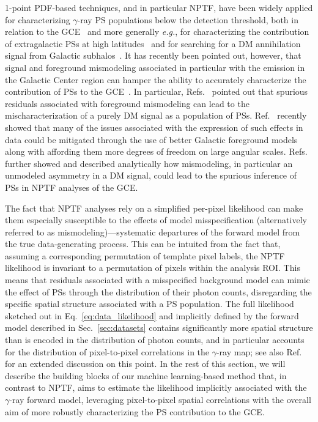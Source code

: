 \documentclass[prd,aps,10pt,nofootinbib,twocolumn,superscriptaddress,preprintnumbers,balancelastpage,longbibliography,floatfix]{revtex4-2}
\begin{document}
1-point PDF-based techniques, and in particular NPTF, have been widely applied for characterizing $\gamma$-ray PS populations below the \Fermi detection threshold, both in relation to the GCE~\cite{Lee:2015fea,Leane:2020pfc,Leane:2020nmi,Buschmann:2020adf,Calore:2021bty} and more generally \emph{e.g.}, for characterizing the contribution of extragalactic PSs at high latitudes~\cite{Lisanti:2016jub,Zechlin:2016pme,Zechlin:2015wdz} and for searching for a DM annihilation signal from Galactic subhalos~\cite{Somalwar:2020awt}. It has recently been pointed out, however, that signal and foreground mismodeling associated in particular with the emission in the Galactic Center region can hamper the ability to accurately characterize the contribution of PSs to the GCE~\cite{Leane:2019xiy,Leane:2020pfc}. In particular, Refs.~\cite{Lee:2015fea,Leane:2019xiy,Chang:2019ars} pointed out that spurious residuals associated with foreground mismodeling can lead to the mischaracterization of a purely DM signal as a population of PSs. Ref.~\cite{Buschmann:2020adf} recently showed that many of the issues associated with the expression of such effects in \Fermi data could be mitigated through the use of better Galactic foreground models along with affording them more degrees of freedom on large angular scales.
Refs.~\cite{Leane:2020pfc,Leane:2020nmi} further showed and described analytically how mismodeling, in particular an unmodeled asymmetry in a DM signal, could lead to the spurious inference of PSs in NPTF analyses of the GCE.

The fact that NPTF analyses rely on a simplified per-pixel likelihood can make them especially susceptible to the effects of model misspecification (alternatively referred to as mismodeling)---systematic departures of the forward model from the true data-generating process. This can be intuited from the fact that, assuming a corresponding permutation of template pixel labels, the NPTF likelihood is invariant to a permutation of pixels within the analysis ROI. This means that residuals associated with a misspecified background model can mimic the effect of PSs through the distribution of their photon counts, disregarding the specific spatial structure associated with a PS population. The full likelihood sketched out in Eq.~\eqref{eq:data_likelihood} and implicitly defined by the forward model described in Sec.~\ref{sec:datasets} contains significantly more spatial structure than is encoded in the distribution of photon counts, and in particular accounts for the distribution of pixel-to-pixel correlations in the $\gamma$-ray map; see also Ref.~\cite{List:2021aer} for an extended discussion on this point.
In the rest of this section, we will describe the building blocks of our machine learning-based method that, in contrast to NPTF, aims to estimate the likelihood implicitly associated with the $\gamma$-ray forward model, leveraging pixel-to-pixel spatial correlations with the overall aim of more robustly characterizing the PS contribution to the GCE.
\end{document}
